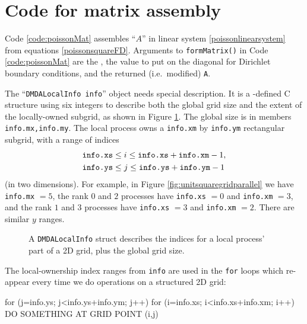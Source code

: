 \section{Code for matrix assembly}

Code \ref{code:poissonMat} assembles ``$A$'' in linear system \eqref{poissonlinearsystem} from equations \eqref{poissonsquareFD}.  Arguments to \texttt{formMatrix()} in Code \ref{code:poissonMat} are the \pDM, the value to put on the diagonal for Dirichlet boundary conditions, and the returned (i.e.~modified) \pMat \texttt{A}.


The ``\texttt{DMDALocalInfo info}'' object needs special description.  It is a \PETSc-defined C structure using six integers to describe both the global grid size and the extent of the locally-owned subgrid, as shown in Figure \ref{fig:localpartofgrid}.  The global size is in members \texttt{info.mx,info.my}.  The local process owns a \texttt{info.xm} by \texttt{info.ym} rectangular subgrid, with a range of indices
\begin{align*}
&\text{\texttt{info.xs}} \le i \le \text{\texttt{info.xs}} +\text{\texttt{info.xm}}-1, \\
&\text{\texttt{info.ys}} \le j \le \text{\texttt{info.ys}} +\text{\texttt{info.ym}}-1
\end{align*}
(in two dimensions).  For example, in Figure \ref{fig:unitsquaregridparallel} we have \texttt{info.mx} $=5$, the rank $0$ and $2$ processes have \texttt{info.xs} $=0$ and \texttt{info.xm} $=3$, and the rank $1$ and $3$ processes have \texttt{info.xs} $=3$ and \texttt{info.xm} $=2$.  There are similar $y$ ranges.

\begin{figure}

\caption{A \texttt{DMDALocalInfo} struct describes the indices for a local process' part of a 2D grid, plus the global grid size.}
\label{fig:localpartofgrid}
\end{figure}

The local-ownership index ranges from \texttt{info} are used in the \texttt{for} loops which re-appear every time we do operations on a structured 2D grid:
\begin{code}
for (j=info.ys; j<info.ys+info.ym; j++) {
  for (i=info.xs; i<info.xs+info.xm; i++) {
    DO SOMETHING AT GRID POINT (i,j)
  }
}
\end{code}

